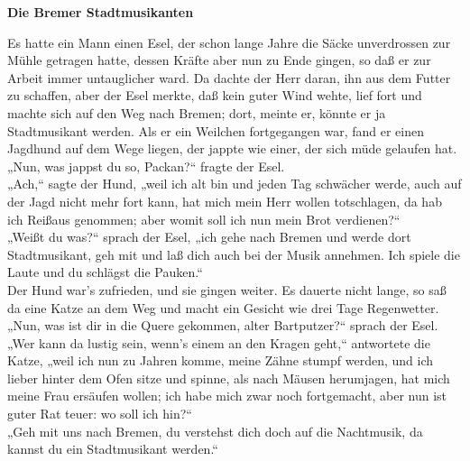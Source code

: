 \documentclass[12pt,a4paper]{article}
\begin{document}
\begin{center}
\Large{\textbf{Die Bremer Stadtmusikanten}}
\end{center}

\raggedright
\setlength{\parindent}{1em}
\setlength{\parskip}{0.5\baselineskip}

Es hatte ein Mann einen Esel, der schon lange Jahre die Säcke unverdrossen zur Mühle getragen hatte, dessen Kräfte aber nun zu Ende gingen, so daß er zur Arbeit immer untauglicher ward. Da dachte der Herr daran, ihn aus dem Futter zu schaffen, aber der Esel merkte, daß kein guter Wind wehte, lief fort und machte sich auf den Weg nach Bremen; dort, meinte er, könnte er ja Stadtmusikant werden. Als er ein Weilchen fortgegangen war, fand er einen Jagdhund auf dem Wege liegen, der jappte wie einer, der sich müde gelaufen hat.\\

„Nun, was jappst du so, Packan?“ fragte der Esel.\\

„Ach,“ sagte der Hund, „weil ich alt bin und jeden Tag schwächer werde, auch auf der Jagd nicht mehr fort kann, hat mich mein Herr wollen totschlagen, da hab ich Reißaus genommen; aber womit soll ich nun mein Brot verdienen?“\\

„Weißt du was?“ sprach der Esel, „ich gehe nach Bremen und werde dort Stadtmusikant, geh mit und laß dich auch bei der Musik annehmen. Ich spiele die Laute und du schlägst die Pauken.“\\

Der Hund war's zufrieden, und sie gingen weiter. Es dauerte nicht lange, so saß da eine Katze an dem Weg und macht ein Gesicht wie drei Tage Regenwetter.\\

„Nun, was ist dir in die Quere gekommen, alter Bartputzer?“ sprach der Esel.\\

„Wer kann da lustig sein, wenn's einem an den Kragen geht,“ antwortete die Katze, „weil ich nun zu Jahren komme, meine Zähne stumpf werden, und ich lieber hinter dem Ofen sitze und spinne, als nach Mäusen herumjagen, hat mich meine Frau ersäufen wollen; ich habe mich zwar noch fortgemacht, aber nun ist guter Rat teuer: wo soll ich hin?“\\

„Geh mit uns nach Bremen, du verstehst dich doch auf die Nachtmusik, da kannst du ein Stadtmusikant werden.“\\
\end{document}
